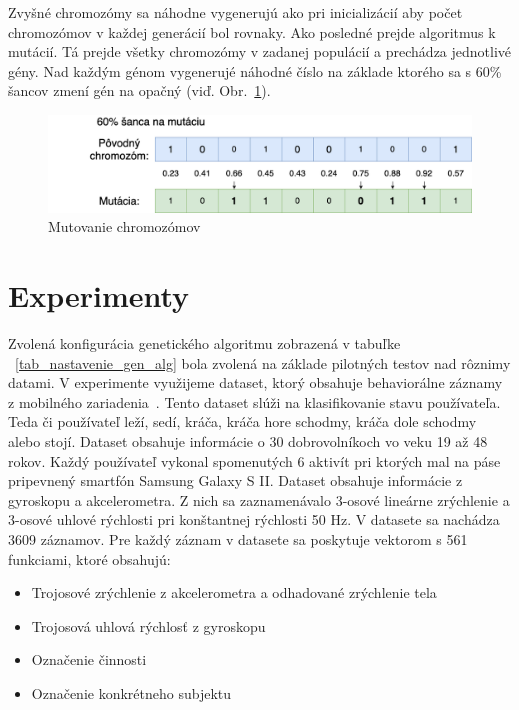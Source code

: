 \documentclass[runningheads]{llncs}
\begin{document}
Zvyšné chromozómy sa náhodne vygenerujú ako pri inicializácií aby počet chromozómov v každej generácií bol rovnaky. 
Ako posledné prejde algoritmus k mutácií. Tá prejde všetky chromozómy v zadanej populácií a prechádza jednotlivé gény.
Nad každým génom vygenerujé náhodné číslo na základe ktorého sa s 60\% šancov zmení gén na opačný (viď. Obr.~\ref{fig_ga_mutovanie}). 

\begin{figure}
\includegraphics[width=\textwidth]{image/mutacia.png}
\caption{Mutovanie chromozómov} \label{fig_ga_mutovanie}
\end{figure}

\section{Experimenty}

Zvolená konfigurácia genetického algoritmu zobrazená v tabuľke ~\ref{tab_nastavenie_gen_alg} bola zvolená na 
základe pilotných testov nad rôznimy datami. V experimente využijeme dataset, ktorý obsahuje behaviorálne 
záznamy z mobilného zariadenia~\cite{ref_dataset_anguita,ref_dataset}. Tento dataset slúži na klasifikovanie
stavu používateľa. Teda či používateľ leží, sedí, kráča, kráča hore schodmy, kráča dole schodmy alebo stojí.
Dataset obsahuje informácie o 30 dobrovolníkoch vo veku 19 až 48 rokov. Každý používateľ vykonal spomenutých
6 aktivít pri ktorých mal na páse pripevnený smartfón Samsung Galaxy S II. Dataset obsahuje informácie z 
gyroskopu a akcelerometra. Z nich sa zaznamenávalo 3-osové lineárne zrýchlenie a 3-osové uhlové rýchlosti 
pri konštantnej rýchlosti 50 Hz. V datasete sa nachádza 3609 záznamov. Pre každý záznam v datasete sa poskytuje 
vektorom s 561 funkciami, ktoré obsahujú:

\begin{itemize}
\item Trojosové zrýchlenie z akcelerometra a odhadované zrýchlenie tela
\item Trojosová uhlová rýchlosť z gyroskopu
\item Označenie činnosti
\item Označenie konkrétneho subjektu
\end{itemize}
\end{document}
